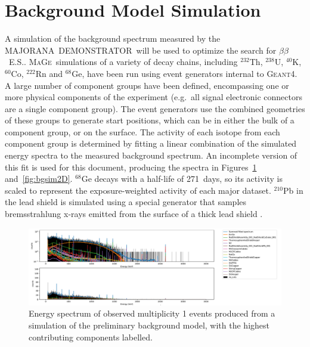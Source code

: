 \documentclass[notitlepage,rmp,aps,10pt]{revtex4-1}
\newcommand{\MJ}{M{\footnotesize AJORANA}}
\newcommand{\Demo}{D{\footnotesize EMON\-STRAT\-OR}}
\newcommand{\MJD}{\MJ\ \Demo}
\newcommand{\bb}{${\beta \beta}$}
\newcommand{\bbes}{\bb~E.S.}
\newcommand{\Mage}{\textsc{MaGe}}
\newcommand{\geant}{\textsc{Geant4}}
\newcommand{\iso}[2]{$^{#1}$#2}
\newcommand{\Ge}[1]{\iso{#1}{Ge}}
\newcommand{\Th}[1]{\iso{#1}{Th}}
\newcommand{\Co}[1]{\iso{#1}{Co}}
\begin{document}
\section{Background Model Simulation}
A simulation of the background spectrum measured by the \MJD\ will be used to optimize the search for \bbes.
\Mage\ simulations of a variety of decay chains, including \Th{232}, \iso{238}{U}, \iso{40}{K}, \Co{60}, \iso{222}{Rn} and \Ge{68}, have been run using event generators internal to \geant.
A large number of component groups have been defined, encompassing one or more physical components of the experiment (e.g.~all signal electronic connectors are a single component group).
The event generators use the combined geometries of these groups to generate start positions, which can be in either the bulk of a component group, or on the surface.
The activity of each isotope from each component group is determined by fitting a linear combination of the simulated energy spectra to the measured background spectrum.
An incomplete version of this fit is used for this document, producing the spectra in Figures~\ref{fig:bgsim1D} and~\ref{fig:bgsim2D}\cite{buuck2019}.
\Ge{68} decays with a half-life of 271~days, so its activity is scaled to represent the exposure-weighted activity of each major dataset.
\iso{210}{Pb} in the lead shield is simulated using a special generator that samples bremsstrahlung x-rays emitted from the surface of a thick lead shield \cite{VOJTYLA1996}.

\begin{figure}
  \centering
  \includegraphics[width=1\linewidth]{BGsim1D}
  \caption[Simulation of multiplicty 1 events from the background model]{\label{fig:bgsim1D}
    Energy spectrum of observed multiplicity 1 events produced from a simulation of the preliminary background model, with the highest contributing components labelled.
  }
\end{figure}
\end{document}
